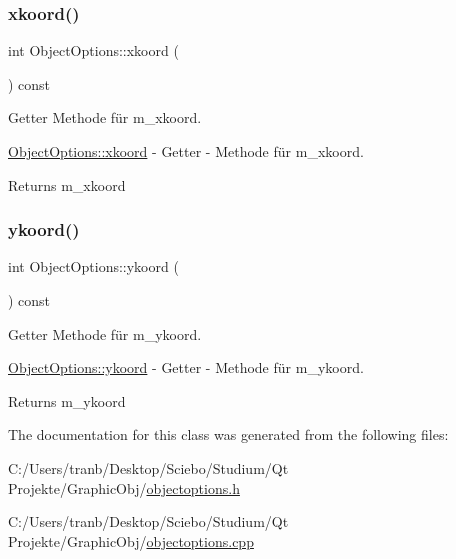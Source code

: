 \subsubsection{\texorpdfstring{xkoord()}{xkoord()}}
{\footnotesize\ttfamily int Object\+Options\+::xkoord (\begin{DoxyParamCaption}{ }\end{DoxyParamCaption}) const}



Getter Methode für m\+\_\+xkoord. 

\hyperlink{class_object_options_a738e07899e3eff5aeb2f998bf527b804}{Object\+Options\+::xkoord} -\/ Getter -\/ Methode für m\+\_\+xkoord.

\begin{DoxyReturn}{Returns}
m\+\_\+xkoord


\end{DoxyReturn}
\mbox{\label{class_object_options_a3306979371a1f706724d2e5a449d3f72}} 
\subsubsection{\texorpdfstring{ykoord()}{ykoord()}}
{\footnotesize\ttfamily int Object\+Options\+::ykoord (\begin{DoxyParamCaption}{ }\end{DoxyParamCaption}) const}



Getter Methode für m\+\_\+ykoord. 

\hyperlink{class_object_options_a3306979371a1f706724d2e5a449d3f72}{Object\+Options\+::ykoord} -\/ Getter -\/ Methode für m\+\_\+ykoord.

\begin{DoxyReturn}{Returns}
m\+\_\+ykoord


\end{DoxyReturn}


The documentation for this class was generated from the following files\+:\begin{DoxyCompactItemize}
\item 
C\+:/\+Users/tranb/\+Desktop/\+Sciebo/\+Studium/\+Qt Projekte/\+Graphic\+Obj/\hyperlink{objectoptions_8h}{objectoptions.\+h}\item 
C\+:/\+Users/tranb/\+Desktop/\+Sciebo/\+Studium/\+Qt Projekte/\+Graphic\+Obj/\hyperlink{objectoptions_8cpp}{objectoptions.\+cpp}\end{DoxyCompactItemize}
